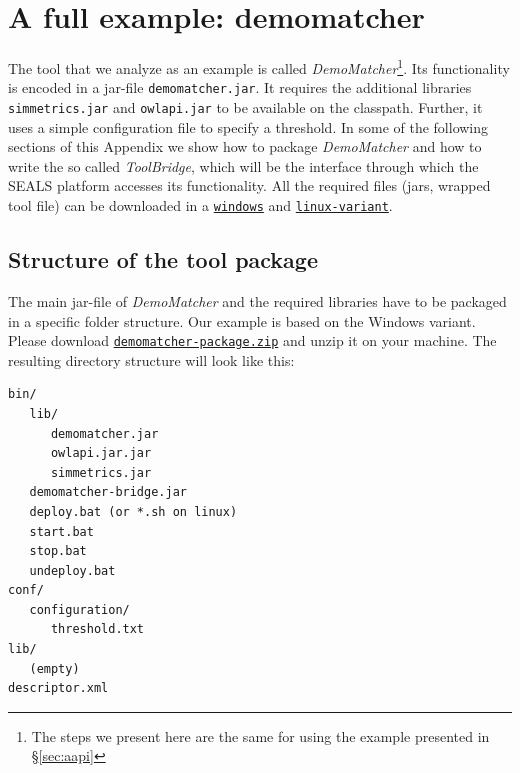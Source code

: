 \documentclass{article}
\def\file#1{\textcolor{grayy}{\texttt{#1}}}
\def\tool#1{\textsl{#1}}
\begin{document}
\newpage
\appendix


\section{A full example: demomatcher}
\label{sec:demomatcher}


The tool that we analyze as an example is called \tool{DemoMatcher}\footnote{The steps we present here are the same for using the example presented in \S\ref{sec:aapi}}. Its functionality is encoded in a jar-file \file{demomatcher.jar}. It requires the additional libraries \file{simmetrics.jar} and \file{owlapi.jar} to be available on the classpath. Further, it uses a simple configuration file to specify a threshold. In some of the following sections of this Appendix we show how to package \tool{DemoMatcher} and how to write the so called \emph{ToolBridge}, which will be the interface through which the SEALS platform accesses its functionality. All the required files (jars, wrapped tool file) can be downloaded in a \href{http://oaei.ontologymatching.org/2011/tutorial/windows/demomatcher-package.zip}{\nolinkurl{windows}} and \href{http://oaei.ontologymatching.org/2011/tutorial/linux/demomatcher-package.zip}{\nolinkurl{linux-variant}}.


\subsection{Structure of the tool package}
\label{sec:structure}

The main jar-file of \tool{DemoMatcher} and the required libraries have to be packaged in a specific folder structure. Our example is based on the Windows variant. Please download \href{http://oaei.ontologymatching.org/2011/tutorial/windows/demomatcher-package.zip}{\file{demomatcher-package.zip}} and unzip it on your machine. The resulting directory structure will look like this:

\begin{verbatim}
bin/
   lib/
      demomatcher.jar
      owlapi.jar.jar
      simmetrics.jar
   demomatcher-bridge.jar
   deploy.bat (or *.sh on linux)
   start.bat
   stop.bat
   undeploy.bat
conf/
   configuration/
      threshold.txt
lib/
   (empty)
descriptor.xml  
\end{verbatim}
\end{document}
